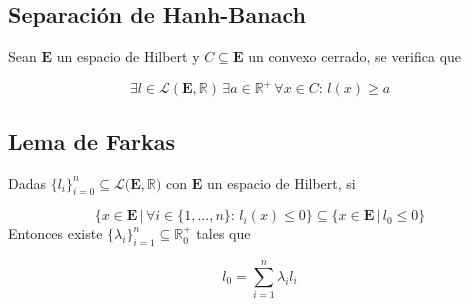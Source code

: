 \subsection{Separación de Hanh-Banach}

Sean $\mathbf{E}$ un espacio de Hilbert y $C\subseteq\mathbf{E}$ un convexo cerrado, se verifica que

\[\exists l\in\mathcal{L}(\mathbf{E},\mathbb{R})\,\exists a\in\mathbb{R^+}\,\forall x\in C:\,l(x)\geq a\]

\subsection{Lema de Farkas}
\label{L:Farkas}
Dadas $\{l_i\}^n_{i=0}\subseteq\mathcal{L}(\mathbf{E},\mathbb{R)}$ con $\mathbf{E}$ un espacio de Hilbert, si

\[\{x\in\mathbf{E}\,|\,\forall i\in\{1,...,n\}:\,
l_i(x)\leq 0\}\subseteq\{x\in\mathbf{E}\,|\,l_0\leq 0\}\]
\bigbreak
Entonces existe $\{\lambda_i\}^n_{i=1}\subseteq\mathbb{R}^+_0$ tales que

\[l_0 = \sum^n_{i=1}\lambda_il_i\]

\newpage